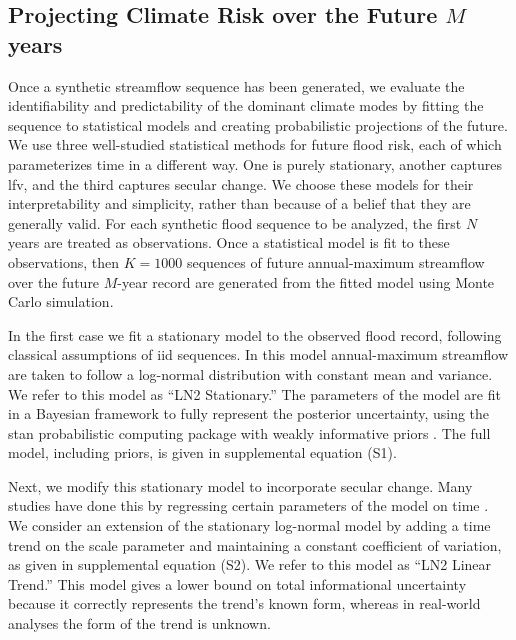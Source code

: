 \documentclass[
  draft,
  linenumbers
]{agujournal2019}
\begin{document}
\subsection{Projecting Climate Risk over the Future $M$ years}\label{sec:methods-estimating}

Once a synthetic streamflow sequence has been generated, we evaluate the identifiability and predictability of the dominant climate modes by fitting the sequence to statistical models and creating probabilistic projections of the future.
We use three well-studied statistical methods for future flood risk, each of which parameterizes time in a different way.
One is purely stationary, another captures \gls{lfv}, and the third captures secular change.
We choose these models for their interpretability and simplicity, rather than because of a belief that they are generally valid.
For each synthetic flood sequence to be analyzed, the first $N$ years are treated as observations.
Once a statistical model is fit to these observations, then $K=\num{1000}$ sequences of future annual-maximum streamflow over the future $M$-year record are generated from the fitted model using Monte Carlo simulation.

In the first case we fit a stationary model to the observed flood record, following classical assumptions of \gls{iid} sequences.
In this model annual-maximum streamflow are taken to follow a log-normal distribution with constant mean and variance.
We refer to this model as ``LN2 Stationary.''
The parameters of the model are fit  in a Bayesian framework to fully represent the posterior uncertainty, using the stan probabilistic computing package \citep{Carpenter:2017ke} with weakly informative priors \citep{gelman:2017,simpson:2017}.
The full model, including priors, is given in supplemental equation (S1).

Next, we modify this stationary model to incorporate secular change.
Many studies have done this by regressing certain parameters of the model on time \citep[see][for a comprehensive review]{Salas:2018ge}.
We consider an extension of the stationary log-normal model by adding a time trend on the scale parameter and maintaining a constant coefficient of variation, as given in supplemental equation (S2).
We refer to this model as ``LN2 Linear Trend.''
This model gives a lower bound on total informational uncertainty because it correctly represents the trend's known form, whereas in real-world analyses the form of the trend is unknown.
\end{document}

